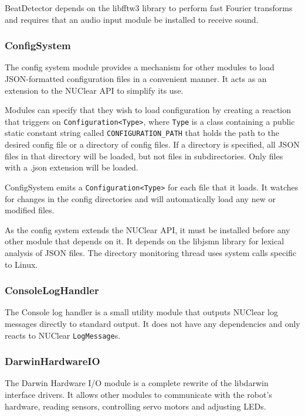 \documentclass[english,12pt]{scrartcl}
\begin{document}
				BeatDetector depends on the libfftw3 library to perform fast Fourier transforms
				and requires that an audio input module be installed to receive sound.


			\subsubsection{ConfigSystem}
				The config system module provides a mechanism for other modules to load
				JSON-formatted configuration files in a convenient manner. It acts as an
				extension to the NUClear API to simplify its use.

				Modules can specify that they wish to load configuration by creating a reaction
				that triggers on \texttt{Configuration<Type>}, where \texttt{Type} is a class
				containing a public static constant string called \texttt{CONFIGURATION\_PATH}
				that holds the path	to the desired config file or a directory of config files. If
				a directory is specified, all JSON files in that directory will be loaded, but
				not files in subdirectories. Only files with a .json extension will be loaded.

				ConfigSystem emits a \texttt{Configuration<Type>} for each file that it loads. It
				watches for changes in the config directories and will automatically load any new
				or modified files.

				As the config system extends the NUClear API, it must be installed before any
				other module that depends on it. It depends on the libjsmn library for lexical
				analysis of JSON files. The directory monitoring thread uses system calls
				specific to Linux.


			\subsubsection{ConsoleLogHandler}
				The Console log handler is a small utility module that outputs NUClear log
				messages directly to standard output. It does not have any dependencies and
				only reacts to NUClear \texttt{LogMessage}s.


			\subsubsection{DarwinHardwareIO}
				The Darwin Hardware I/O module is a complete rewrite of the libdarwin interface
				drivers. It allows other modules to communicate with the robot's hardware, reading
				sensors, controlling servo motors and adjusting LEDs.
\end{document}
